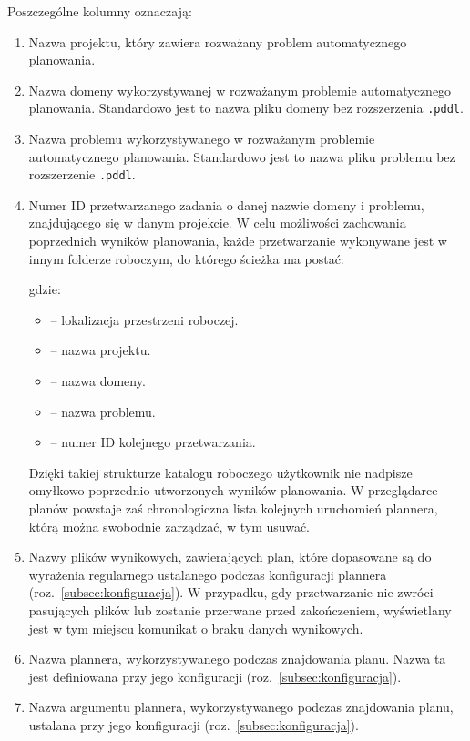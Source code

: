 \noindent
Poszczególne kolumny oznaczają:
\begin{enumerate}
\item Nazwa projektu, który zawiera rozważany problem automatycznego planowania.
\item Nazwa domeny wykorzystywanej w rozważanym problemie automatycznego planowania. Standardowo jest to nazwa pliku domeny bez rozszerzenia \texttt{.pddl}.
\item Nazwa problemu wykorzystywanego w rozważanym problemie automatycznego planowania. Standardowo jest to nazwa pliku problemu bez rozszerzenie \texttt{.pddl}.
\item Numer ID przetwarzanego zadania o danej nazwie domeny i problemu, znajdującego się w danym projekcie. W celu możliwości zachowania poprzednich wyników planowania, każde przetwarzanie wykonywane jest w innym folderze roboczym, do którego ścieżka ma postać:

\noindent
\centerline{}

\noindent
gdzie:

\begin{itemize}
\item \textbf{} -- lokalizacja przestrzeni roboczej.
\item \textbf{} -- nazwa projektu.
\item \textbf{} -- nazwa domeny.
\item \textbf{} -- nazwa problemu.
\item \textbf{} -- numer ID kolejnego przetwarzania.
\end{itemize}
Dzięki takiej strukturze katalogu roboczego użytkownik nie nadpisze omyłkowo poprzednio utworzonych wyników planowania. W przeglądarce planów powstaje zaś chronologiczna lista kolejnych uruchomień plannera, którą można swobodnie zarządzać, w tym usuwać.
\item Nazwy plików wynikowych, zawierających plan, które dopasowane są do wyrażenia regularnego ustalanego podczas konfiguracji plannera (roz.~\ref{subsec:konfiguracja}). W przypadku, gdy przetwarzanie nie zwróci pasujących plików lub zostanie przerwane przed zakończeniem, wyświetlany jest w tym miejscu komunikat o braku danych wynikowych.
\item Nazwa plannera, wykorzystywanego podczas znajdowania planu. Nazwa ta jest definiowana przy jego konfiguracji (roz.~\ref{subsec:konfiguracja}).
\item Nazwa argumentu plannera, wykorzystywanego podczas znajdowania planu, ustalana przy jego konfiguracji (roz.~\ref{subsec:konfiguracja}).
\end{enumerate}


